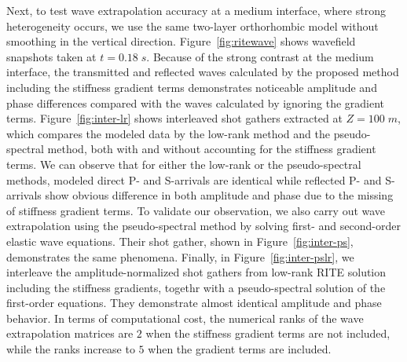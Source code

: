 
Next, to test wave extrapolation accuracy at a medium interface, where strong heterogeneity occurs, we use the same two-layer orthorhombic model without smoothing in the vertical direction. Figure~\ref{fig:ritewave} shows wavefield snapshots taken at $t=0.18\;s$. Because of the strong contrast at the medium interface, the transmitted and reflected waves calculated by the proposed method including the stiffness gradient terms demonstrates noticeable amplitude and phase differences compared with the waves calculated by ignoring the gradient terms. Figure~\ref{fig:inter-lr} shows interleaved shot gathers extracted at $Z=100\;m$, which compares the modeled data by the low-rank method and the pseudo-spectral method, both with and without accounting for the stiffness gradient terms. We can observe that for either the low-rank or the pseudo-spectral methods, modeled direct P- and S-arrivals are identical while reflected P- and S-arrivals show obvious difference in both amplitude and phase due to the missing of stiffness gradient terms. To validate our observation, we also carry out wave extrapolation using the pseudo-spectral method by solving first- and second-order elastic wave equations. Their shot gather, shown in Figure~\ref{fig:inter-ps}, demonstrates the same phenomena. Finally, in Figure~\ref{fig:inter-pslr}, we interleave the amplitude-normalized shot gathers from low-rank RITE solution including the stiffness gradients, togethr with a pseudo-spectral solution of the first-order equations. They demonstrate almost identical amplitude and phase behavior. In terms of computational cost, the numerical ranks of the wave extrapolation matrices are $2$ when the stiffness gradient terms are not included, while the ranks increase to $5$ when the gradient terms are included.

